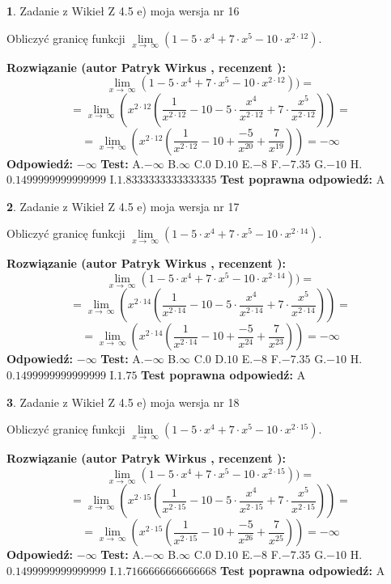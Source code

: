 \documentclass[12pt, a4paper]{article}
\theoremstyle{definition} %
\newtheorem{zad}{}
\newcommand{\zadStart}[1]{\begin{zad}#1\newline}
\newcommand{\zadStop}{\end{zad}}
\newcommand{\rozwStart}[2]{\noindent \textbf{Rozwiązanie (autor #1 , recenzent #2): }\newline}
\newcommand{\rozwStop}{\newline}
\newcommand{\odpStart}{\noindent \textbf{Odpowiedź:}\newline}
\newcommand{\odpStop}{\newline}
\newcommand{\testStart}{\noindent \textbf{Test:}\newline}
\newcommand{\testStop}{\newline}
\newcommand{\kluczStart}{\noindent \textbf{Test poprawna odpowiedź:}\newline}
\newcommand{\kluczStop}{\newline}
\begin{document}
\zadStart{Zadanie z Wikieł Z 4.5 e) moja wersja nr 16}


Obliczyć granicę funkcji  $\lim\limits_{x\to\ \infty}(1 - 5 \cdot x^{4}+7 \cdot x^{5}- 10 \cdot x^{2\cdot12})$.
\zadStop
\rozwStart{Patryk Wirkus}{}
$$\lim\limits_{x\to\ \infty}(1 - 5 \cdot x^{4}+7 \cdot x^{5}- 10 \cdot x^{2\cdot12}))=$$
$$=\lim\limits_{x\to\ \infty}(x^{2\cdot12}(\frac{1}{x^{2\cdot12}}-10 -5 \cdot \frac{x^{4}}{x^{2\cdot12}}+7 \cdot \frac{x^{5}}{x^{2\cdot12}}))=$$
$$=\lim\limits_{x\to\ \infty}(x^{2\cdot12}(\frac{1}{x^{2\cdot12}}-10 + \frac{-5}{x^{20}}+ \frac{7}{x^{19}}))=-\infty$$
\rozwStop
\odpStart
$-\infty$
\odpStop
\testStart
A.$-\infty$ B.$\infty$ C.$0$ D.$10$ E.$-8$
F.$-7.35$ G.$-10$
H.$0.1499999999999999$
I.$1.8333333333333335$
\testStop
\kluczStart
A
\kluczStop



\zadStart{Zadanie z Wikieł Z 4.5 e) moja wersja nr 17}


Obliczyć granicę funkcji  $\lim\limits_{x\to\ \infty}(1 - 5 \cdot x^{4}+7 \cdot x^{5}- 10 \cdot x^{2\cdot14})$.
\zadStop
\rozwStart{Patryk Wirkus}{}
$$\lim\limits_{x\to\ \infty}(1 - 5 \cdot x^{4}+7 \cdot x^{5}- 10 \cdot x^{2\cdot14}))=$$
$$=\lim\limits_{x\to\ \infty}(x^{2\cdot14}(\frac{1}{x^{2\cdot14}}-10 -5 \cdot \frac{x^{4}}{x^{2\cdot14}}+7 \cdot \frac{x^{5}}{x^{2\cdot14}}))=$$
$$=\lim\limits_{x\to\ \infty}(x^{2\cdot14}(\frac{1}{x^{2\cdot14}}-10 + \frac{-5}{x^{24}}+ \frac{7}{x^{23}}))=-\infty$$
\rozwStop
\odpStart
$-\infty$
\odpStop
\testStart
A.$-\infty$ B.$\infty$ C.$0$ D.$10$ E.$-8$
F.$-7.35$ G.$-10$
H.$0.1499999999999999$
I.$1.75$
\testStop
\kluczStart
A
\kluczStop



\zadStart{Zadanie z Wikieł Z 4.5 e) moja wersja nr 18}


Obliczyć granicę funkcji  $\lim\limits_{x\to\ \infty}(1 - 5 \cdot x^{4}+7 \cdot x^{5}- 10 \cdot x^{2\cdot15})$.
\zadStop
\rozwStart{Patryk Wirkus}{}
$$\lim\limits_{x\to\ \infty}(1 - 5 \cdot x^{4}+7 \cdot x^{5}- 10 \cdot x^{2\cdot15}))=$$
$$=\lim\limits_{x\to\ \infty}(x^{2\cdot15}(\frac{1}{x^{2\cdot15}}-10 -5 \cdot \frac{x^{4}}{x^{2\cdot15}}+7 \cdot \frac{x^{5}}{x^{2\cdot15}}))=$$
$$=\lim\limits_{x\to\ \infty}(x^{2\cdot15}(\frac{1}{x^{2\cdot15}}-10 + \frac{-5}{x^{26}}+ \frac{7}{x^{25}}))=-\infty$$
\rozwStop
\odpStart
$-\infty$
\odpStop
\testStart
A.$-\infty$ B.$\infty$ C.$0$ D.$10$ E.$-8$
F.$-7.35$ G.$-10$
H.$0.1499999999999999$
I.$1.7166666666666668$
\testStop
\kluczStart
A
\kluczStop
\end{document}

